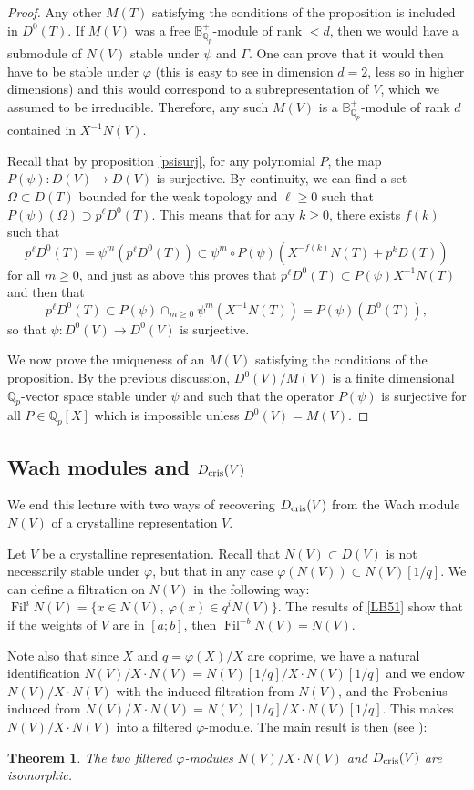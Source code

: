 \documentclass[11pt]{amsart}
\def\Q{{\mathbb Q}_p}
\def\ra{\rightarrow}
\def\bplus{\mathbb{B}^+}
\def\dcris{D_{\rm cris}}
\def\on{\operatorname}
\newtheorem{thm}[definit]{\bf{Theorem}}
\begin{document}
\begin{proof}
Any other $M(T)$ satisfying the conditions of the proposition is 
included in $D^0(T)$.  
If $M(V)$ was a free $\bplus_{\Q}$-module of rank $<d$, then 
we would have a submodule of $N(V)$ stable under $\psi$ and 
$\Gamma$. One can prove that it would then have to be stable under 
$\varphi$ (this is easy to see in dimension $d=2$, less so in higher 
dimensions) and this would correspond  
to a subrepresentation of $V$, which 
we assumed to be irreducible. Therefore, any such $M(V)$ is a 
$\bplus_{\Q}$-module of rank $d$ contained in $X^{-1}N(V)$.  
 
Recall that by proposition \ref{psisurj}, for any 
polynomial $P$, the map $P(\psi) : D(V) \ra D(V)$  
is surjective. By 
continuity, we can find a set $\Omega \subset D(T)$  
bounded for the weak topology and $\ell \geq 0$ 
such that $P(\psi)(\Omega) \supset p^\ell D^0(T)$.  
This means that for any $k \geq 
0$, there exists $f(k)$ such that \[ p^\ell D^0(T) =  
\psi^m(p^\ell D^0(T)) \subset \psi^m \circ 
P(\psi) (X^{-f(k)} N(T) + p^k D(T)) \]  
for all $m \geq 0$, and just as 
above this proves that  
$p^\ell D^0(T) \subset P(\psi) X^{-1}N(T)$ and then that  
\[ p^\ell D^0(T)\subset P(\psi) \cap_{m \geq 0} \psi^m(X^{-1}N(T)) = 
P(\psi)(D^0(T)), \]  
so that $\psi: D^0(V) \ra D^0(V)$ is surjective. 
 
We now prove the uniqueness of an $M(V)$ satisfying the conditions of 
the proposition. By the previous discussion, $D^0(V)/M(V)$ is a finite 
dimensional $\Q$-vector space stable under $\psi$ and such that the 
operator $P(\psi)$ is surjective for all $P \in \Q[X]$ which is 
impossible unless $D^0(V)=M(V)$. 
\end{proof} 
 
\subsection{Wach modules and $\dcris(V)$}\label{LB54} 
We end this lecture with two ways of recovering $\dcris(V)$ from the 
Wach module $N(V)$ of a crystalline representation $V$. 
 
Let $V$ be a crystalline representation. Recall that $N(V) \subset 
D(V)$ is not necessarily stable under $\varphi$, but that in any case 
$\varphi(N(V)) \subset N(V) [1/q]$. 
We can define a filtration on $N(V)$ in the following way: $\on{Fil}^i 
N(V) = \{ x \in N(V),\ \varphi(x) \in q^i N(V) \}$. The results of 
\ref{LB51} show that if the weights of $V$ are in $[a;b]$, then 
$\on{Fil}^{-b} N(V) = N(V)$.  
 
Note also that since $X$ and $q=\varphi(X)/X$ are coprime, we have a natural 
identification $N(V)/X \cdot N(V) = N(V) [1/q] / X \cdot N(V) [1/q]$ and we endow 
$N(V)/ X \cdot N(V)$ with the induced filtration from $N(V)$, and the 
Frobenius induced from $N(V)/X \cdot N(V) =  
N(V) [1/q] / X \cdot N(V) [1/q]$. This 
makes $N(V)/ X \cdot N(V)$ into a filtered $\varphi$-module. 
The main result is then (see \cite[\S III.4]{LB04}): 
\begin{thm}\label{sdlkfj} 
The two filtered $\varphi$-modules 
$N(V)/ X \cdot N(V)$ and $\dcris(V)$ are isomorphic. 
\end{thm} 
 
\end{document}
